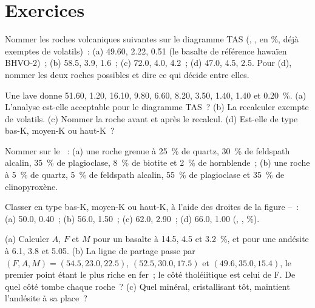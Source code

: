 \section{Exercices}

\begin{exercise}[$\star$]\label{exo:b2:magmatic-series:1}
Nommer les roches volcaniques suivantes sur le diagramme TAS (, , 
en \unit{\percent}, déjà exemptes de volatils)~: (a) 49.60, 2.22, 0.51 (le basalte de référence
hawaïen BHVO-2)~; (b) 58.5, 3.9, 1.6~; (c) 72.0, 4.0, 4.2~; (d) 47.0, 4.5, 2.5.
Pour (d), nommer les deux roches possibles et dire ce qui décide entre elles.
\end{exercise}

\begin{exercise}[$\star$]\label{exo:b2:magmatic-series:2}
Une lave donne  51.60,  1.20,  16.10,  9.80,
 6.60,  8.20,  3.50,  1.40,  1.40 et
 \qty{0.20}{\percent}. (a) L'analyse est-elle acceptable pour le diagramme TAS~?
(b) La recalculer exempte de volatils. (c) Nommer la roche avant et après le
recalcul. (d) Est-elle de type bas-K, moyen-K ou haut-K~?
\end{exercise}

\begin{exercise}[$\star$]\label{exo:b2:magmatic-series:3}
Nommer sur le ~: (a) une roche grenue à \qty{25}{\percent} de quartz,
\qty{30}{\percent} de feldspath alcalin, \qty{35}{\percent} de plagioclase, \qty{8}{\percent}
de biotite et \qty{2}{\percent} de hornblende~; (b) une roche à \qty{5}{\percent} de quartz,
\qty{5}{\percent} de feldspath alcalin, \qty{55}{\percent} de plagioclase et
\qty{35}{\percent} de clinopyroxène.
\end{exercise}

\begin{exercise}[$\star$]\label{exo:b2:magmatic-series:4}
Classer en type bas-K, moyen-K ou haut-K, à l'aide des droites de la figure --~:
(a) 50.0, 0.40~; (b) 56.0, 1.50~; (c) 62.0, 2.90~; (d) 66.0, 1.00 (,
, \unit{\percent}).
\end{exercise}

\begin{exercise}[$\star\star$]\label{exo:b2:magmatic-series:5}
(a) Calculer $A$, $F$ et $M$ pour un basalte à  14.5,  4.5 et
 \qty{3.2}{\percent}, et pour une andésite à 6.1, 3.8 et 5.05.
(b) La ligne de partage passe par $(F, A, M) = (54.5, 23.0, 22.5)$, $(52.5, 30.0,
17.5)$ et $(49.6, 35.0, 15.4)$, le premier point étant le plus riche en fer~; le
côté tholéiitique est celui de F. De quel côté tombe chaque roche~? (c) Quel
minéral, cristallisant tôt, maintient l'andésite à sa place~?
\end{exercise}

